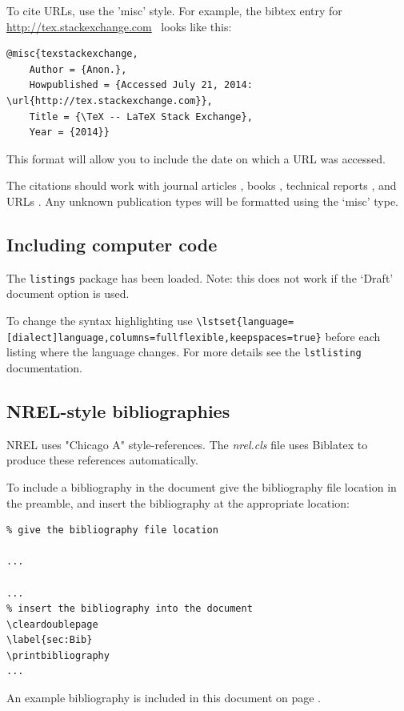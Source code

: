 To cite URLs, use the 'misc' style. For example, the bibtex entry for \href{http://tex.stackexchange.com}{http://tex.stackexchange.com}\ \cite{texstackexchange} looks like this:

\begin{lstlisting}
@misc{texstackexchange,
	Author = {Anon.},
	Howpublished = {Accessed July 21, 2014: \url{http://tex.stackexchange.com}},
	Title = {\TeX -- LaTeX Stack Exchange},
	Year = {2014}}
\end{lstlisting}

This format will allow you to include the date on which a URL was accessed.

The citations should work with journal articles \citep{Clifton_2013_a}, books \citep{Knuth_1984_a, Lamport_1986_a, chicago}, technical reports \citep{TechReportTest}, and URLs \citep{texstackexchange}. Any unknown publication types will be formatted using the `misc' type.

\subsection{Including computer code}
The \texttt{listings} package has been loaded. Note: this does not work if the `Draft' document option is used.

To change the syntax highlighting use \verb+\lstset{language=[dialect]language,columns=fullflexible,keepspaces=true}+ before each listing where the language changes. For more details see the \texttt{lstlisting} documentation.

\subsection{NREL-style bibliographies}
NREL uses "Chicago A" style-references. The \emph{nrel.cls} file uses Biblatex to produce these references automatically. 

To include a bibliography in the document give the bibliography file location in the preamble, and insert the bibliography at the appropriate location:

\begin{lstlisting}
% give the bibliography file location

...

...
% insert the bibliography into the document
\cleardoublepage
\label{sec:Bib}
\printbibliography
...

\end{lstlisting}

An example bibliography is included in this document on page \pageref{sec:Bib}.

